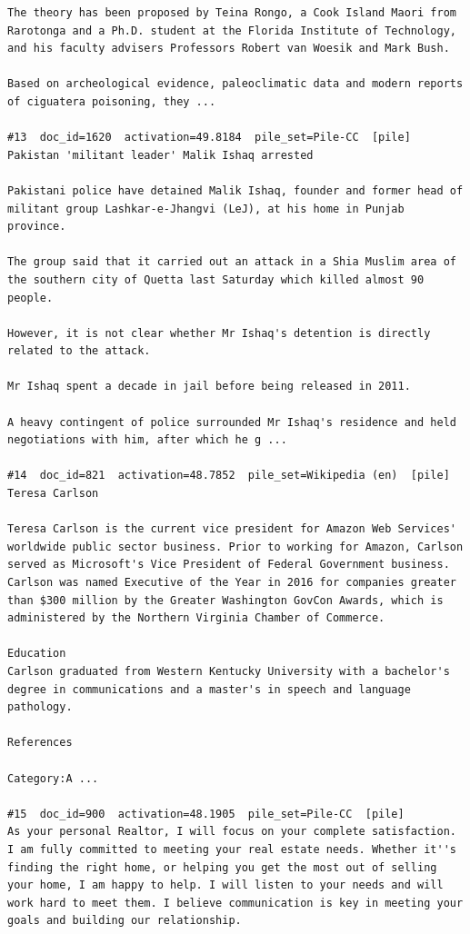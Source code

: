 \begin{verbatim}
The theory has been proposed by Teina Rongo, a Cook Island Maori from Rarotonga and a Ph.D. student at the Florida Institute of Technology, and his faculty advisers Professors Robert van Woesik and Mark Bush.

Based on archeological evidence, paleoclimatic data and modern reports of ciguatera poisoning, they ...

#13  doc_id=1620  activation=49.8184  pile_set=Pile-CC  [pile]
Pakistan 'militant leader' Malik Ishaq arrested

Pakistani police have detained Malik Ishaq, founder and former head of militant group Lashkar-e-Jhangvi (LeJ), at his home in Punjab province.

The group said that it carried out an attack in a Shia Muslim area of the southern city of Quetta last Saturday which killed almost 90 people.

However, it is not clear whether Mr Ishaq's detention is directly related to the attack.

Mr Ishaq spent a decade in jail before being released in 2011.

A heavy contingent of police surrounded Mr Ishaq's residence and held negotiations with him, after which he g ...

#14  doc_id=821  activation=48.7852  pile_set=Wikipedia (en)  [pile]
Teresa Carlson

Teresa Carlson is the current vice president for Amazon Web Services' worldwide public sector business. Prior to working for Amazon, Carlson served as Microsoft's Vice President of Federal Government business. Carlson was named Executive of the Year in 2016 for companies greater than $300 million by the Greater Washington GovCon Awards, which is administered by the Northern Virginia Chamber of Commerce.

Education
Carlson graduated from Western Kentucky University with a bachelor's degree in communications and a master's in speech and language pathology.

References

Category:A ...

#15  doc_id=900  activation=48.1905  pile_set=Pile-CC  [pile]
As your personal Realtor, I will focus on your complete satisfaction. I am fully committed to meeting your real estate needs. Whether it''s finding the right home, or helping you get the most out of selling your home, I am happy to help. I will listen to your needs and will work hard to meet them. I believe communication is key in meeting your goals and building our relationship.


\end{verbatim}
